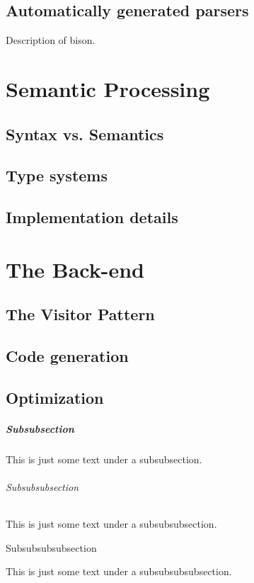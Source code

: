 \documentclass[letterpaper,12pt,openany,reqno]{book}%
\begin{document}
\chapter {Automatically generated parsers}
Description of bison.

\part {Semantic Processing}
\chapter {Syntax vs. Semantics}
\chapter {Type systems}
\chapter {Implementation details}

\part{The Back-end}
\chapter {The Visitor Pattern}
\chapter {Code generation}
\chapter {Optimization}

\subsubsection{Subsubsection}

This is just some text under a subsubsection.

\paragraph{Subsubsubsection}

This is just some  text under a subsubsubsection.

\subparagraph{Subsubsubsubsection}

This is just some text under a subsubsubsubsection.
\end{document}

